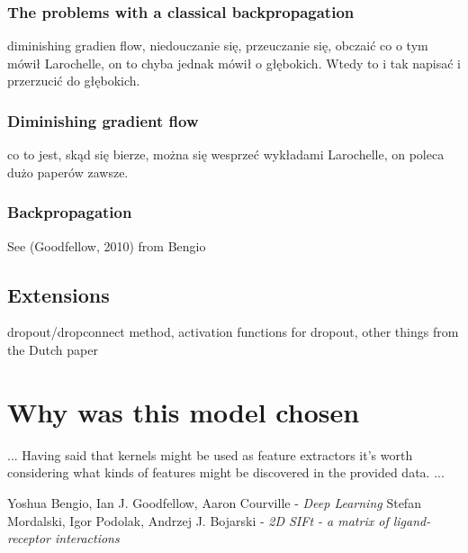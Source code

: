 \documentclass[a4paper,10pt]{report}
\begin{document}
	\subsubsection{The problems with a classical backpropagation} %
	  diminishing gradien flow, niedouczanie się, przeuczanie się, obczaić co o tym mówił Larochelle, on to chyba jednak mówił o głębokich. Wtedy to i tak napisać i przerzucić do głębokich.
	
	\subsubsection{Diminishing gradient flow} %
	  co to jest, skąd się bierze, można się wesprzeć wykładami Larochelle, on poleca dużo paperów zawsze.
	  
	\subsubsection{Backpropagation} %
	  See (Goodfellow, 2010) from Bengio
	
      \subsection{Extensions} %
	dropout/dropconnect method, activation functions for dropout, other things from the Dutch paper
	
	
    \section{Why was this model chosen}
	... Having said that kernels might be used as feature extractors it's worth considering what kinds of features might be discovered in the provided data. ...
  \begin{thebibliography}{99}
      Yoshua Bengio, Ian J. Goodfellow, Aaron Courville - \emph{Deep Learning}
      Stefan Mordalski, Igor Podolak, Andrzej J. Bojarski - \emph{2D SIFt - a matrix of ligand-receptor interactions}
  \end{thebibliography}
    
\end{document}
